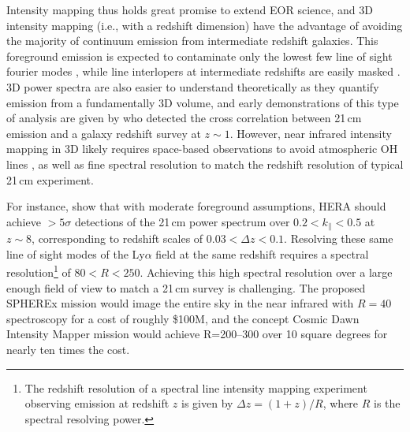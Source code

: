 \documentclass{emulateapj}
\begin{document}
Intensity mapping thus holds great promise to extend EOR science, and 3D intensity mapping (i.e., with a redshift dimension) have the advantage of avoiding the majority of continuum emission from intermediate redshift galaxies. This foreground emission is expected to contaminate only the lowest few line of sight fourier modes \citep{gong17}, while line interlopers at intermediate redshifts are easily masked \citep{Gong2014,gong17,pullen14,Comaschi16}. 3D power spectra are also easier to understand theoretically as they quantify emission from a fundamentally 3D volume, and early demonstrations of this type of analysis are given by \citet{Chang2010,Masui2013} who detected the cross correlation between 21\,cm emission and a galaxy redshift survey at $z\sim1$. However, near infrared intensity mapping in 3D likely requires space-based observations to avoid atmospheric OH lines \citep[e.g.][]{sullivan12}, as well as fine spectral resolution to match the redshift resolution of typical 21\,cm experiment. 

For instance, \citet{PoberNextGen} show that with moderate foreground assumptions, HERA should achieve $>5\sigma$ detections of the 21\,cm power spectrum 	over $0.2<k_\parallel<0.5$ at $z\sim8$, corresponding to redshift scales of $0.03<\Delta z<0.1$. Resolving these same line of sight modes of the Ly$\alpha$ field at the same redshift requires a spectral resolution\footnote{The redshift resolution of a spectral line intensity mapping experiment observing emission at redshift $z$ is given by $\Delta z=(1+z)/R$, where $R$ is the spectral resolving power.} of $80<R<250$. Achieving this high spectral resolution over a large enough field of view to match a 21\,cm survey is challenging. The proposed SPHEREx mission \citep{ScienceWithSpherex,SpherexWhitePaper} would image the entire sky in the near infrared with $R=40$ spectroscopy for a cost of roughly \$100M, and the concept Cosmic Dawn Intensity Mapper \citep{cooray16} mission would achieve R=200--300 over 10 square degrees for nearly ten times the cost.
\end{document}
